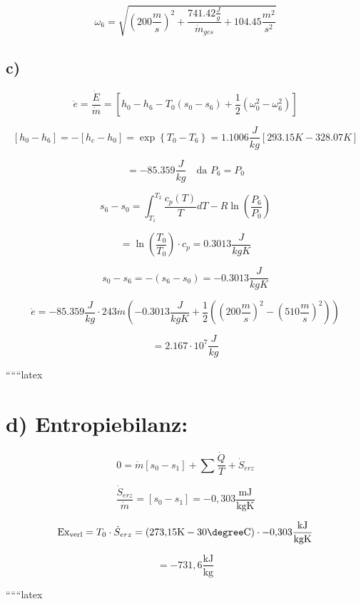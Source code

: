 \begin{equation*}
    \omega_6 = \sqrt{(200 \frac{m}{s})^2 + \frac{741.42 \frac{J}{g}}{\dot{m}_{ges}} + 104.45 \frac{m^2}{s^2}}
\end{equation*}

\subsection*{c)}

\begin{equation*}
    \dot{e} = \frac{\dot{E}}{\dot{m}} = \left[ h_0 - h_6 - T_0 (s_0 - s_6) + \frac{1}{2} (\omega_0^2 - \omega_6^2) \right]
\end{equation*}

\begin{equation*}
    \left[ h_0 - h_6 \right] = - \left[ h_c - h_0 \right] = \exp \left\{ T_0 - T_6 \right\} = 1.1006 \frac{J}{kg} \left[ 293.15 K - 328.07 K \right]
\end{equation*}

\begin{equation*}
    = -85.359 \frac{J}{kg} \quad \text{da } P_6 = P_0
\end{equation*}

\begin{equation*}
    s_6 - s_0 = \int_{T_1}^{T_2} \frac{c_p(T)}{T} dT - R \ln \left( \frac{P_6}{P_0} \right)
\end{equation*}

\begin{equation*}
    = \ln \left( \frac{T_0}{T_0} \right) \cdot c_p = 0.3013 \frac{J}{kgK}
\end{equation*}

\begin{equation*}
    s_0 - s_6 = - (s_6 - s_0) = -0.3013 \frac{J}{kgK}
\end{equation*}

\begin{equation*}
    \dot{e} = -85.359 \frac{J}{kg} \cdot 243 \dot{m} \left( -0.3013 \frac{J}{kgK} + \frac{1}{2} \left( (200 \frac{m}{s})^2 - (510 \frac{m}{s})^2 \right) \right)
\end{equation*}

\begin{equation*}
    = 2.167 \cdot 10^7 \frac{J}{kg}
\end{equation*}

``````latex

\section*{d) Entropiebilanz:}

\[
0 = \dot{m} \left[ s_0 - s_1 \right] + \sum \frac{\dot{Q}}{T} + \dot{S}_{erz}
\]

\[
\frac{\dot{S}_{erz}}{\dot{m}} = \left[ s_0 - s_1 \right] = -0{,}303 \frac{\text{mJ}}{\text{kgK}}
\]

\[
\text{Ex}_{\text{verl}} = T_0 \cdot \dot{S}_{erz} = \left( 273{,}15 \text{K} - 30 \degree \text{C} \right) \cdot -0{,}303 \frac{\text{kJ}}{\text{kgK}}
\]

\[
= -731{,}6 \frac{\text{kJ}}{\text{kg}}
\]

``````latex


